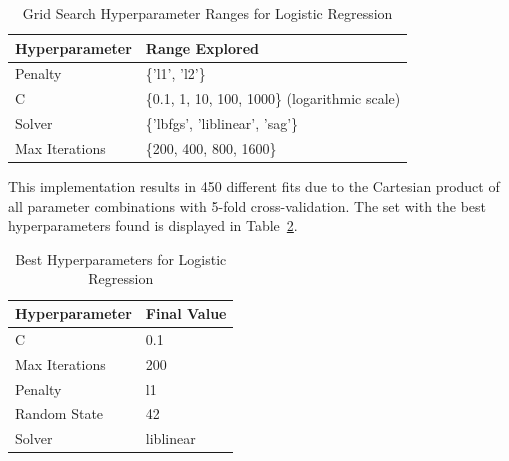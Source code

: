 \vspace{3mm} 

\begin{table}[h!]
\centering
\renewcommand{\arraystretch}{1.3} %
\begin{tabular}{ll}
\hline
\textbf{Hyperparameter} & \textbf{Range Explored}                          \\ \hline
Penalty                 & \{'l1', 'l2'\}                                    \\ 
C                       & \{0.1, 1, 10, 100, 1000\} (logarithmic scale)     \\ 
Solver                  & \{'lbfgs', 'liblinear', 'sag'\}                   \\ 
Max Iterations          & \{200, 400, 800, 1600\}                          \\ \hline
\end{tabular}
\caption{Grid Search Hyperparameter Ranges for Logistic Regression}
\label{tab:hyperparameter_grid}
\end{table}

\vspace{3mm} 


This implementation results in 450 different fits due to the Cartesian product of all parameter combinations with 5-fold cross-validation. The set with the best hyperparameters found is displayed in Table~\ref{tab:logistic_regression_hyperparameters}.

\vspace{3mm}

\begin{table}[h!]
\centering
\renewcommand{\arraystretch}{1.2} %
\begin{tabular}{ll}
\hline
\textbf{Hyperparameter} & \textbf{Final Value}       \\ \hline
C                       & 0.1                        \\ 
Max Iterations          & 200                        \\ 
Penalty                 & l1                         \\ 
Random State            & 42                         \\ 
Solver                  & liblinear                  \\ \hline
\end{tabular}
\caption{Best Hyperparameters for Logistic Regression}
\label{tab:logistic_regression_hyperparameters}
\end{table}

